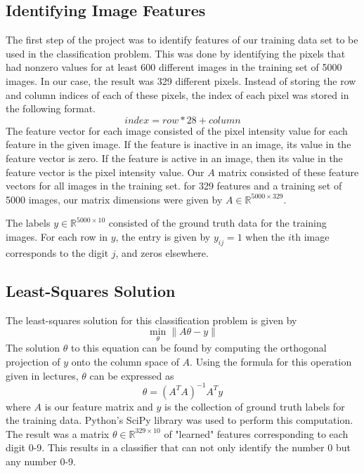 \documentclass[conference]{IEEEtran}
\begin{document}
\subsection{Identifying Image Features}
The first step of the project was to identify features of our training data set to be used in the classification problem. This was done by identifying the pixels that had nonzero values for at least 600 different images in the training set of 5000 images. In our case, the result was 329 different pixels. Instead of storing the row and column indices of each of these pixels, the index of each pixel was stored in the following format. 
\begin{equation}
index = row*28 + column
\end{equation}
The feature vector for each image consisted of the pixel intensity value for each feature in the given image. If the feature is inactive in an image, its value in the feature vector is zero. If the feature is active in an image, then its value in the feature vector is the pixel intensity value. Our $A$ matrix consisted of these feature vectors for all images in the training set. for 329 features and a training set of 5000 images, our matrix dimensions were given by $A \in \mathbb{R}^{5000 \times 329}$. 

The labels $y \in \mathbb{R}^{5000 \times 10}$ consisted of the ground truth data for the training images. For each row in $y$, the entry is given by $y_{ij} = 1$ when the $i$th image corresponds to the digit $j$, and zeros elsewhere. 

\subsection{Least-Squares Solution}
The least-squares solution for this classification problem is given by 
\begin{equation}
\min_{\theta} \| A\theta - y\|
\end{equation}
The solution $\theta$ to this equation can be found by computing the orthogonal projection of $y$ onto the column space of $A$. Using the formula for this operation given in lectures, $\theta$ can be expressed as 
\begin{equation}
    \theta = (A^TA)^{-1}A^Ty
\end{equation}
where $A$ is our feature matrix and $y$ is the collection of ground truth labels for the training data. Python's SciPy library was used to perform this computation. The result was a matrix $\theta \in \mathbb{R}^{329 \times 10}$ of "learned" features corresponding to each digit 0-9. This results in a classifier that can not only identify the number 0 but any number 0-9. 
\end{document}
